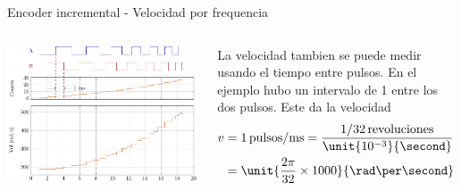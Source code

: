 \documentclass[presentation,aspectratio=169]{beamer}
\begin{document}
\begin{frame}[label={sec:org5e6269f}]{Encoder incremental - Velocidad por frequencia}
\begin{columns}
\begin{column}{0.5\columnwidth}
\begin{center}
\includegraphics[width=\textwidth]{../../figures/encoder-signals-freqs}
\end{center}
\end{column}
\begin{column}{0.5\columnwidth}
La velocidad tambien se puede medir usando el tiempo entre pulsos. En el ejemplo hubo un intervalo de \unit{1}{\milli\second} entre los dos pulsos. Este da la velocidad
\begin{align*}
 v &= 1 \, \text{pulsos/ms} = \frac{1/32 \, \text{revoluciones}}{\unit{10^{-3}}{\second}}\\
 &= \unit{\frac{2\pi}{32}\times 1000}{\rad\per\second} = \unit{196.3}{\rad\per\second}
 \end{align*}
\end{column}
\end{columns}
\end{frame}
\end{document}
